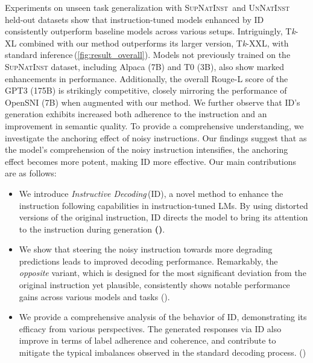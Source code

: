 Experiments on unseen task generalization with \textsc{SupNatInst}\,\citep{sni_dataset} and \textsc{UnNatInst}\,\citep{unnatural_ni_dataset} held-out datasets show that instruction-tuned models enhanced by ID consistently outperform baseline models across various setups. Intriguingly, T\textit{k}-XL combined with our method outperforms its larger version, T\textit{k}-XXL, with standard inference\,(\autoref{fig:result_overall}). Models not previously trained on the \textsc{SupNatInst} dataset, including Alpaca (7B) and T0 (3B), also show marked enhancements in performance. Additionally, the overall Rouge-L score of the GPT3 (175B) is strikingly competitive, closely mirroring the performance of OpenSNI (7B) when augmented with our method. 
We further observe that ID's generation exhibits increased both adherence to the instruction and an improvement in semantic quality. To provide a comprehensive understanding, we investigate the anchoring effect of noisy instructions. Our findings suggest that as the model's comprehension of the noisy instruction intensifies, the anchoring effect becomes more potent, making ID more effective. Our main contributions are as follows:
%
\begin{itemize}
    \item We introduce \textit{Instructive Decoding}\,(ID), a novel method to enhance the instruction following capabilities in instruction-tuned LMs. By using distorted versions of the original instruction, ID directs the model to bring its attention to the instruction during generation \textbf{()}.
    \item We show that steering the noisy instruction towards more degrading predictions leads to improved decoding performance. Remarkably, the \textit{opposite} variant, which is designed for the most significant deviation from the original instruction yet plausible, consistently shows notable performance gains across various models and tasks (\textbf{}).
    \item We provide a comprehensive analysis of the behavior of ID, demonstrating its efficacy from various perspectives. The generated responses via ID also improve in terms of label adherence and coherence, and contribute to mitigate the typical imbalances observed in the standard decoding process. (\textbf{})
\end{itemize}
